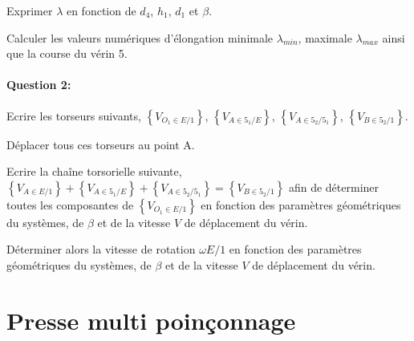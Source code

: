 Exprimer $\lambda$ en fonction de $d_4$, $h_1$, $d_1$ et $\beta$.

Calculer les valeurs numériques d'élongation minimale $\lambda_{min}$, maximale $\lambda_{max}$ ainsi que la course du vérin 5.

\paragraph{Question 2:}

Ecrire les torseurs suivants, $\left\{V_{O_1\in E/1}\right\}$, $\left\{V_{A\in 5_1/E}\right\}$, $\left\{V_{A\in 5_2/5_1}\right\}$, $\left\{V_{B\in 5_2/1}\right\}$.

Déplacer tous ces torseurs au point A.

Ecrire la chaîne torsorielle suivante, $\left\{V_{A\in E/1}\right\}+\left\{V_{A\in 5_1/E}\right\}+\left\{V_{A\in 5_2/5_1}\right\}=\left\{V_{B\in 5_2/1}\right\}$ afin de déterminer toutes les composantes de $\left\{V_{O_1\in E/1}\right\}$ en fonction des paramètres géométriques du systèmes, de $\beta$ et de la vitesse $V$ de déplacement du vérin.

Déterminer alors la vitesse de rotation $\omega{E/1}$ en fonction des paramètres géométriques du systèmes, de $\beta$ et de la vitesse $V$ de déplacement du vérin.

\newpage

\section{Presse multi poinçonnage}

